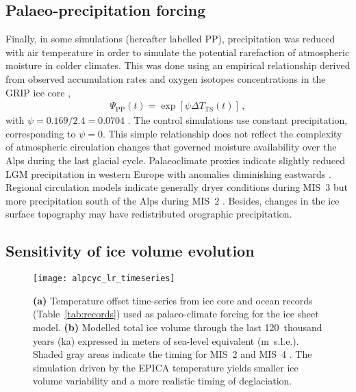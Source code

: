 \documentclass[tc, manuscript]{copernicus}
\begin{document}
\subsection{Palaeo-precipitation forcing}
\label{sec:palprec}

    Finally, in some simulations (hereafter labelled PP), precipitation was
    reduced with air temperature in
    order to simulate the potential rarefaction of atmospheric moisture in
    colder climates. This was done using an empirical relationship derived from
    observed accumulation rates and oxygen isotopes concentrations in the GRIP
    ice core \citep{Dahl-Jensen.etal.1993},
    \begin{align}
      {\Psi}_{\text{PP}}(t) = \exp[\psi{\Delta}T_{\text{TS}}(t)] \,,
    \end{align}
    with $\psi=0.169/2.4=0.0704$ \citep{Huybrechts.2002}. The control
    simulations use constant precipitation, corresponding to $\psi=0$.
    This simple relationship does not reflect the complexity of atmospheric
    circulation changes that governed moisture availability over the Alps
    during the last glacial cycle. Palaeoclimate proxies indicate slightly
    reduced LGM precipitation in western Europe with anomalies diminishing
    eastwards \citep{Wu.etal.2007}. Regional circulation models indicate
    generally dryer conditions during MIS~3 \citep{Barron.Pollard.2002,
    Kjellstrom.etal.2010} but more precipitation south of the Alps during MIS~2
    \citep{Strandberg.etal.2011, Ludwig.etal.2016}. Besides, changes in the
    ice surface topography may have redistributed orographic precipitation.


\subsection{Sensitivity of ice volume evolution}
\label{sec:timeseries}

    \begin{figure*}[t]
      \centerline{\texttt{[image: alpcyc\_lr\_timeseries]}}
      \caption{%
        \textbf{(a)} Temperature offset time-series from ice core and ocean
        records (Table~\ref{tab:records}) used as palaeo-climate forcing for
        the ice sheet model.
        \textbf{(b)} Modelled total ice volume through the last 120~thousand
        years (ka) expressed in meters of sea-level equivalent (m~s.l.e.).
        Shaded gray areas indicate the timing for MIS~2 and MIS~4
        \citep{Lisiecki.Raymo.2005}. The simulation
        driven by the EPICA temperature yields smaller ice volume variability
        and a more realistic timing of deglaciation.}
      \label{fig:timeseries}
    \end{figure*}
\end{document}
